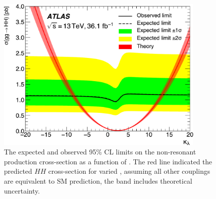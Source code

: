 \begin{figure}[!htbp]
  \centering
\includegraphics[width=0.9\textwidth]{chapters/chapter5_yybb/images/limits/lambda.pdf}
\caption[The expected and observed limits on the non-resonant \HH production cross-section as a function of \klambda]
{The expected and observed 95\% \gls{CL} limits on the non-resonant \HH production cross-section as a function of \klambda. The red line indicated the predicted $HH$ cross-section for varied \klambda, assuming all other couplings are equivalent to \gls{SM} prediction, the band includes theoretical uncertainty.} 
\label{fig:limits-klambda}
\end{figure}